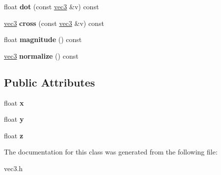 \begin{DoxyCompactItemize}
float {\bfseries dot} (const \hyperlink{classvec3}{vec3} \&v) const
\item 
\mbox{\label{classvec3_afd56f8007d6dea5b4308c91b6a711212}} 
\hyperlink{classvec3}{vec3} {\bfseries cross} (const \hyperlink{classvec3}{vec3} \&v) const
\item 
\mbox{\label{classvec3_a0769861ea523fa4ced1e3ee265acd8c3}} 
float {\bfseries magnitude} () const
\item 
\mbox{\label{classvec3_aa40fb1158038d41c8bb75293d5444841}} 
\hyperlink{classvec3}{vec3} {\bfseries normalize} () const
\end{DoxyCompactItemize}
\subsection*{Public Attributes}
\begin{DoxyCompactItemize}
\item 
\mbox{\label{classvec3_a4ee2cfd5c2698031a47ab7f898d8d47b}} 
float {\bfseries x}
\item 
\mbox{\label{classvec3_a891379795a14c80936cde4170239a138}} 
float {\bfseries y}
\item 
\mbox{\label{classvec3_aa76213efcc5d656cc14b71db80a92162}} 
float {\bfseries z}
\end{DoxyCompactItemize}


The documentation for this class was generated from the following file\+:\begin{DoxyCompactItemize}
\item 
vec3.\+h\end{DoxyCompactItemize}
